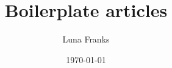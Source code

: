 \documentclass[12pt, a4paper]{article}
\title{Boilerplate articles}
\author{Luna Franks}
\date{\today}
\begin{document}
	\maketitle
	\tableofcontents
	\newpage
	
\section{~}
	
	\subsection{~}
		\paragraph{~}
	
\end{document}
